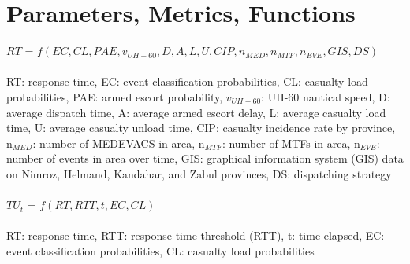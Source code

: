 \documentclass[10pt]{article}
\begin{document}
\section{Parameters, Metrics, Functions}
$RT$ = $f(EC, CL, PAE, v_{UH-60}, D, A, L, U, CIP, n_{MED}, n_{MTF}, n_{EVE},  GIS, DS)$ \\~\\
RT: response time,
EC: event classification probabilities,
CL: casualty load probabilities,
PAE: armed escort probability,
$v_{UH-60}$: UH-60 nautical speed,
D: average dispatch time,
A: average armed escort delay,
L: average casualty load time,
U: average casualty unload time,
CIP: casualty incidence rate by province,
n$_{MED}$: number of MEDEVACS in area,
n$_{MTF}$: number of MTFs in area,
n$_{EVE}$: number of events in area over time,
GIS: graphical information system (GIS) data on Nimroz, Helmand, Kandahar, and Zabul provinces,
DS: dispatching strategy
\\~\\
$TU_t$ = $f(RT, RTT, t, EC, CL)$ \\~\\
RT: response time,
RTT: response time threshold (RTT),
t: time elapsed,
EC: event classification probabilities,
CL: casualty load probabilities
\end{document}

